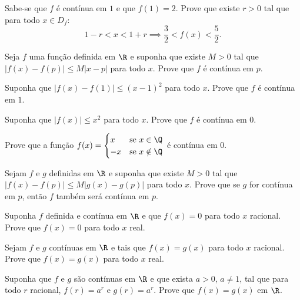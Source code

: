 \begin{exercicio}[14]
Sabe-se que $f$ é contínua em $1$ e que $f(1) = 2$. Prove que existe $r > 0$ tal que para todo $x \in D_f$:
\[
1 - r < x < 1 + r \implies \dfrac{3}{2} < f(x) < \dfrac{5}{2}.
\]
\end{exercicio}

\begin{exercicio}[15]
Seja $f$ uma função definida em $\R$ e suponha que existe $M > 0$ tal que $|f(x) - f(p)| \le M|x - p|$ para todo $x$. Prove que $f$ é contínua em $p$.
\end{exercicio}

\begin{exercicio}[16]
Suponha que $|f(x) - f(1)| \le (x - 1)^2$ para todo $x$. Prove que $f$ é contínua em $1$.
\end{exercicio}

\begin{exercicio}[17]
Suponha que $|f(x)| \le x^2$ para todo $x$. Prove que $f$ é contínua em $0$.
\end{exercicio}

\begin{exercicio}[18]
Prove que a função $f(x) = \begin{cases} x & \text{se } x \in \Q \\ -x & \text{se } x \notin \Q \end{cases}$ é contínua em $0$.
\end{exercicio}

\begin{exercicio}[19]
Sejam $f$ e $g$ definidas em $\R$ e suponha que existe $M > 0$ tal que $|f(x) - f(p)| \le M|g(x) - g(p)|$ para todo $x$. Prove que se $g$ for contínua em $p$, então $f$ também será contínua em $p$.
\end{exercicio}

\begin{exercicio}[20]
Suponha $f$ definida e contínua em $\R$ e que $f(x) = 0$ para todo $x$ racional. Prove que $f(x) = 0$ para todo $x$ real.
\end{exercicio}

\begin{exercicio}[21]
Sejam $f$ e $g$ contínuas em $\R$ e tais que $f(x) = g(x)$ para todo $x$ racional. Prove que $f(x) = g(x)$ para todo $x$ real.
\end{exercicio}

\begin{exercicio}[22]
Suponha que $f$ e $g$ são contínuas em $\R$ e que exista $a > 0$, $a \neq 1$, tal que para todo $r$ racional, $f(r) = a^r$ e $g(r) = a^r$. Prove que $f(x) = g(x)$ em $\R$.
\end{exercicio}

